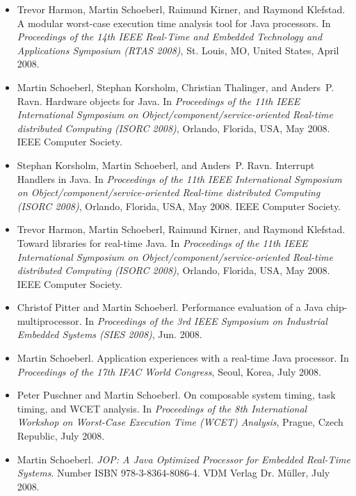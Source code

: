 \begin{itemize}
\item Trevor Harmon, Martin Schoeberl, Raimund Kirner, and
    Raymond Klefstad. A modular worst-case execution time
    analysis tool for Java
  processors. In {\em Proceedings of the 14th IEEE Real-Time and
 Embedded Technology and Applications Symposium (RTAS 2008)}, St.
 Louis, MO, United States, April 2008.

\item Martin Schoeberl, Stephan Korsholm, Christian Thalinger,
    and Anders~P. Ravn. Hardware objects for {Java}. In {\em
    Proceedings of the 11th IEEE International Symposium on
  Object/component/service-oriented Real-time distributed
  Computing (ISORC 2008)}, Orlando, Florida, USA, May 2008. IEEE
  Computer Society.
  
\item Stephan Korsholm, Martin Schoeberl, and Anders~P. Ravn.
    Interrupt Handlers in {Java}.
 In {\em Proceedings of the 11th IEEE International Symposium on
  Object/component/service-oriented Real-time distributed
  Computing (ISORC 2008)}, Orlando, Florida, USA, May 2008. IEEE
  Computer Society.

\item Trevor Harmon, Martin Schoeberl, Raimund Kirner, and
    Raymond Klefstad. Toward libraries for real-time Java. In
    {\em Proceedings of the 11th IEEE International Symposium on
    Object/component/service-oriented Real-time distributed
  Computing (ISORC 2008)}, Orlando, Florida, USA, May 2008. IEEE
  Computer Society.

\item Christof Pitter and Martin Schoeberl. Performance
    evaluation of a {Java} chip-multiprocessor. In {\em
    Proceedings of the 3rd IEEE Symposium on Industrial Embedded
    Systems (SIES 2008)}, Jun. 2008.

\item Martin Schoeberl. Application experiences with a real-time
    {J}ava processor. In {\em Proceedings of the 17th IFAC World
    Congress}, Seoul, Korea, July 2008.

\item Peter Puschner and Martin Schoeberl. On composable system
    timing, task timing, and WCET analysis. In {\em Proceedings
    of the 8th International Workshop on Worst-Case Execution
    Time (WCET) Analysis}, Prague, Czech
  Republic, July 2008.

\item Martin Schoeberl. {\em JOP: A Java Optimized Processor for
    Embedded Real-Time Systems}. Number ISBN 978-3-8364-8086-4.
    VDM Verlag Dr. M{\"u}ller, July 2008.


\end{itemize}
